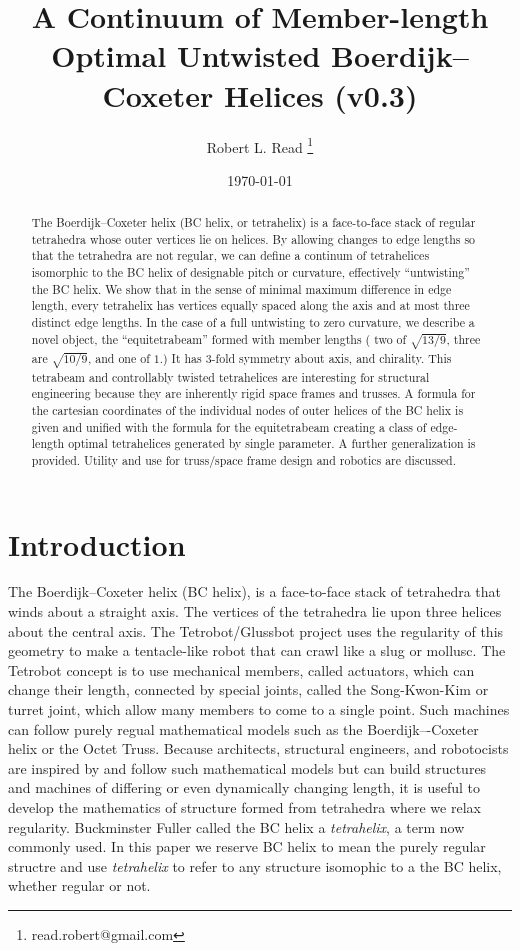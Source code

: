 \documentclass[11pt]{article}
\title{A Continuum of Member-length Optimal Untwisted Boerdijk--Coxeter Helices (v0.3)}
\author{Robert L. Read
  \thanks{read.robert@gmail.com}
}
\affil{Founder, Public Invention, an educational non-profit.}
\date{\today}
\begin{document}
\maketitle


\begin{abstract}
  The Boerdijk--Coxeter helix (BC helix, or tetrahelix) is a face-to-face stack of regular tetrahedra whose outer vertices lie on helices.
  By allowing changes to edge lengths so that the tetrahedra are not regular, we can define a continum of tetrahelices isomorphic to the
  BC helix of designable pitch or curvature, effectively ``untwisting'' the BC helix. We show that in the sense of minimal maximum
  difference in edge length, every tetrahelix has vertices equally spaced along the axis and at most three distinct edge lengths.
  In the case of a full untwisting to zero curvature, we describe a novel object, the
  ``equitetrabeam'' formed with member lengths ( two of $\sqrt{13/9}$, three are $\sqrt{10/9}$, and one of $1$.)
  It has 3-fold symmetry about  axis, and chirality.  This tetrabeam and controllably twisted tetrahelices are
  interesting for structural engineering because they are inherently rigid space frames and trusses.
  A formula for the cartesian coordinates of the individual nodes of outer helices of the BC helix is given and
  unified with the formula for the equitetrabeam creating a class of edge-length optimal tetrahelices generated by single parameter.
  A further generalization is provided.
  Utility and use for truss/space frame design and robotics are discussed.
\end{abstract}


\section{Introduction}

The Boerdijk--Coxeter helix\cite{coxeter1985simplicial} (BC helix),
is a face-to-face stack of tetrahedra that winds about a straight axis.
The vertices of the tetrahedra
lie upon three
helices about the central axis.
The Tetrobot/Glussbot\cite{TetrobotBook} project
uses the regularity of this geometry to make a tentacle-like robot that can crawl like a slug or mollusc.
The Tetrobot concept
is to use mechanical members, called actuators, which can change their length, connected by special joints, called the Song-Kwon-Kim\cite{song2003spherical} or turret joint,
which allow many
members to come to a single point.
Such machines can follow purely regual mathematical models such as the Boerdijk–-Coxeter helix or the Octet Truss\cite{richard1961synergetic}.
Because architects, structural engineers, and robotocists are inspired by and follow such mathematical models but can build
structures and machines of differing or even dynamically changing length, it is useful to develop
the mathematics of structure formed from tetrahedra where we relax regularity. Buckminster Fuller called the BC helix a \emph{tetrahelix}\cite{fuller1982synergetics},
a term now commonly used. In this paper we reserve BC helix to mean the purely regular structre and use \emph{tetrahelix} to refer
to any structure isomophic to a the BC helix, whether regular or not.
\end{document}
